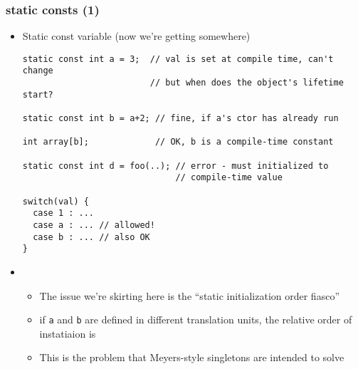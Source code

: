 \begin{frame}[fragile,t]
\frametitle{static consts (1)}
\begin{itemize}[<+->]

\item Static const variable (now we're getting somewhere)
{\scriptsize\begin{verbatim}
static const int a = 3;  // val is set at compile time, can't change
                         // but when does the object's lifetime start?

static const int b = a+2; // fine, if a's ctor has already run

int array[b];             // OK, b is a compile-time constant

static const int d = foo(..); // error - must initialized to 
                              // compile-time value

switch(val) {
  case 1 : ...
  case a : ... // allowed!
  case b : ... // also OK
}
\end{verbatim}
}
\item {}
\begin{itemize}
  \item The issue we're skirting here is the ``static initialization order fiasco''
  \item if \texttt{a} and \texttt{b} are defined in different
    translation units, the relative order of instatiaion is 
  \item This is the problem that Meyers-style singletons are intended
    to solve
\end{itemize}
\end{itemize}
\end{frame}


